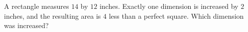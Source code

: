 A rectangle measures $ 14 $ by $ 12 $ inches. Exactly one dimension is increased by $ 2 $ inches, and the resulting area is $ 4 $ less than a perfect square. Which dimension was increased?
